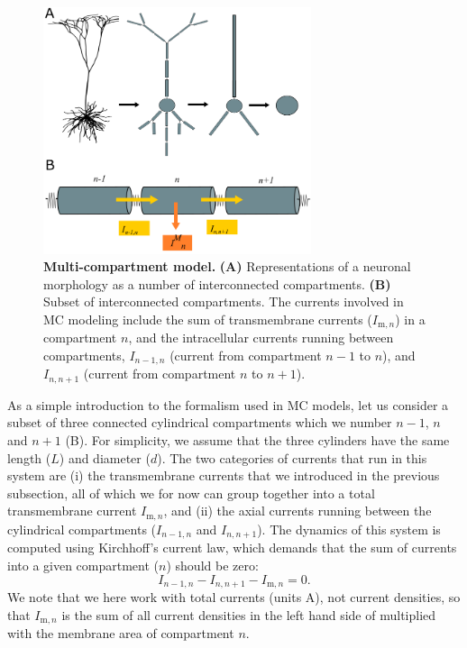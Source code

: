 \begin{figure}[!ht]
\begin{center}
\includegraphics[width=0.7\textwidth]{Figures/Neuron/multikompis.png}
\end{center}
\caption{\textbf{Multi-compartment model.} {\bf (A)} Representations of a neuronal morphology as a number of interconnected compartments. {\bf (B)} Subset of interconnected compartments. The currents involved in MC modeling include the sum of transmembrane currents ($I_{\mathrm{m},n}$) in a compartment $n$, and the intracellular currents running between 
compartments, $I_{n-1,n}$ (current from compartment $n-1$ to $n$), and $I_{n,n+1}$ (current from compartment $n$ to $n+1$).
}
\label{fig:Neuron:multikompisen}
\end{figure}

As a simple introduction to the formalism used in MC models, let us consider a subset of three connected cylindrical compartments which we number $n-1$, $n$ and $n+1$ (B). For simplicity, we assume that the three cylinders have the same length ($L$) and diameter ($d$). The two categories of currents that run in this system are (i) the transmembrane currents that we introduced in the previous subsection, all of which we for now can group together into a total transmembrane current $I_{\mathrm{m},n}$, and (ii) the axial currents running between the cylindrical compartments ($I_{n-1,n}$ and $I_{n,n+1}$). The dynamics of this system is computed using Kirchhoff's current law, which demands that the sum of currents into a given compartment ($n$) should be zero:
\begin{equation}
I_{n-1,n} - I_{n,n+1} - I_{\mathrm{m},n} = 0.
\label{eq:Neuron:Kirch}
\end{equation}
We note that we here work with total currents (units \si{\ampere}), not current densities, so that $I_{\mathrm{m},n}$ is the sum of all current densities in the left hand side of  multiplied with the membrane area of compartment $n$. 

